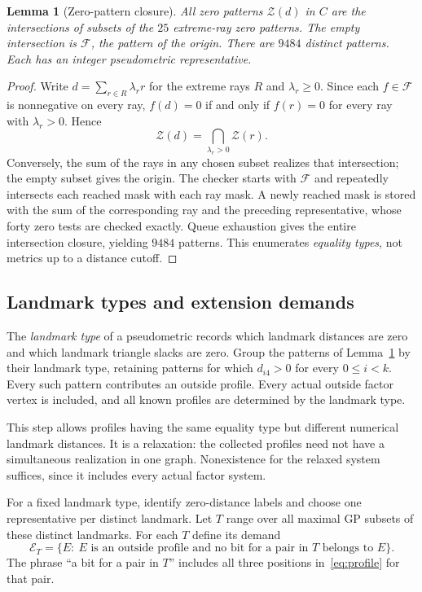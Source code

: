 \documentclass[11pt]{article}
\newtheorem{lemma}[theorem]{Lemma}
\theoremstyle{definition}
\theoremstyle{remark}
\begin{document}
\begin{lemma}[Zero-pattern closure]\label{lem:closure}
All zero patterns $\mathcal Z(d)$ in $C$ are the intersections of subsets
of the $25$ extreme-ray zero patterns. The empty intersection is
$\mathcal F$, the pattern of the origin. There are $9484$ distinct patterns.
Each has an integer pseudometric representative.
\end{lemma}
\begin{proof}
Write $d=\sum_{r\in R}\lambda_r r$ for the extreme rays $R$ and
$\lambda_r\geq0$. Since each $f\in\mathcal F$ is nonnegative on every
ray, $f(d)=0$ if and only if $f(r)=0$ for every ray with $\lambda_r>0$.
Hence
\[
 \mathcal Z(d)=\bigcap_{\lambda_r>0}\mathcal Z(r).
\]
Conversely, the sum of the rays in any chosen subset realizes that
intersection; the empty subset gives the origin.
The checker starts with $\mathcal F$ and repeatedly intersects each
reached mask with each ray mask. A newly reached mask is stored with the
sum of the corresponding ray and the preceding representative, whose
forty zero tests are checked exactly. Queue exhaustion gives the entire
intersection closure, yielding $9484$ patterns. This enumerates
\emph{equality types}, not metrics up to a distance cutoff.
\end{proof}

\subsection{Landmark types and extension demands}

The \emph{landmark type} of a pseudometric records which landmark
distances are zero and which landmark triangle slacks are zero.
Group the patterns of Lemma~\ref{lem:closure} by their landmark type,
retaining patterns for which $d_{i4}>0$ for every $0\leq i<k$.
Every such pattern contributes an outside profile. Every actual outside
factor vertex is included, and all known profiles are determined by the
landmark type.

This step allows profiles having the same equality type but different
numerical landmark distances. It is a relaxation: the collected profiles
need not have a simultaneous realization in one graph. Nonexistence for
the relaxed system suffices, since it includes every actual factor system.

For a fixed landmark type, identify zero-distance labels and choose one
representative per distinct landmark. Let $T$ range over all maximal GP
subsets of these distinct landmarks. For each $T$ define its demand
\[
 \mathcal E_T=\{E:\ E\text{ is an outside profile and no bit for a pair in }T
 \text{ belongs to }E\}.
\]
The phrase ``a bit for a pair in $T$'' includes all three positions
in~\eqref{eq:profile} for that pair.
\end{document}
